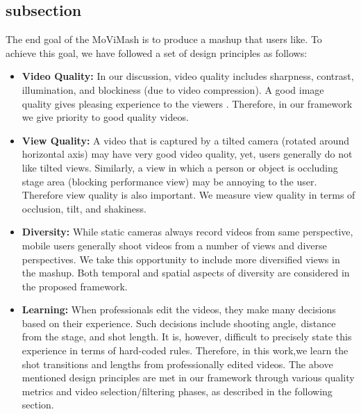 \documentclass{sig-alternate}
\begin{document}
\subsection{subsection}
The end goal of the MoViMash is to produce a mashup that users like. To achieve this goal, we have followed a set of design principles as follows:
\begin{itemize}
\item \textbf{Video Quality:} In our discussion, video quality includes sharpness, contrast, illumination, and blockiness (due to video compression). A good image quality gives pleasing experience to the viewers \cite{10}. Therefore, in our framework we give priority to good quality videos.
\item \textbf{View Quality:} A video that is captured by a tilted camera
(rotated around horizontal axis) may have very good video quality, yet, users generally do not like tilted views. Similarly, a view in which a person or object is occluding stage area (blocking performance view) may be annoying to the user. Therefore view quality is also important. We measure view quality in terms of occlusion, tilt, and shakiness.
\item \textbf{Diversity: } While static cameras always record videos from same perspective, mobile users generally shoot videos from a number of views and diverse perspectives. We take this opportunity to include more diversified views in the mashup. Both temporal and spatial aspects of diversity are considered in the proposed framework.
\item \textbf{Learning:} When professionals edit the videos, they make many decisions based on their experience. Such decisions include shooting angle, distance from the stage, and shot length. It is, however, difficult to precisely state this experience in terms of hard-coded rules. Therefore, in this work,we learn the shot transitions and lengths from professionally edited videos. The above mentioned design principles are met in our framework through various quality metrics and video selection/filtering phases, as described in the following section.
\end{itemize}
\end{document}
